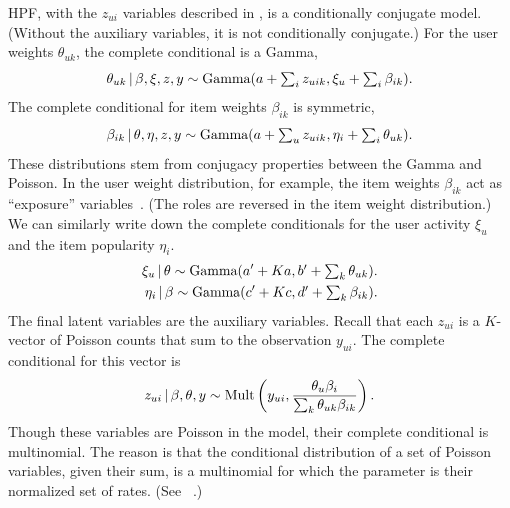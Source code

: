 HPF, with the $z_{ui}$ variables described in , is a
conditionally conjugate model.  (Without the auxiliary variables, it
is not conditionally conjugate.) For the user weights $\theta_{uk}$,
the complete conditional is a Gamma,
\begin{equation}
  \label{eq:user-weight-cc}
  \theta_{uk} \,\vert\, \beta, \xi, z, y \sim
  \textrm{Gamma}(a + \textstyle \sum_{i} z_{uik}, \xi_u + \sum_{i} \beta_{ik}).
\end{equation}
The complete conditional for item weights $\beta_{ik}$ is symmetric,
\begin{equation}
  \label{eq:item-weight-cc}
  \beta_{ik} \,\vert\, \theta, \eta, z, y \sim
  \textrm{Gamma}(a + \textstyle \sum_{u} z_{uik}, \eta_i + \sum_{i} \theta_{uk}).
\end{equation}
These distributions stem from conjugacy properties between the Gamma
and Poisson. In the user weight distribution, for example, the item
weights $\beta_{ik}$ act as ``exposure'' variables~\cite{Gelman:1995}.
(The roles are reversed in the item weight distribution.) We can
similarly write down the complete conditionals for the user activity
$\xi_u$ and the item popularity $\eta_i$.
\begin{align*}
  \label{eq:user-weight-cc}
  \xi_{u} \,\vert\, \theta \sim
  \textrm{Gamma}(a' + \textstyle Ka, b' + \sum_{k} \theta_{uk}).\nonumber\\
  \eta_{i} \,\vert\, \beta \sim
  \textrm{Gamma}(c' + \textstyle Kc, d' + \sum_{k} \beta_{ik}).\nonumber\\
\end{align*}
The final latent variables are the auxiliary variables.  Recall that
each $z_{ui}$ is a $K$-vector of Poisson counts that sum to the
observation $y_{ui}$. The complete conditional for this vector is
\begin{equation}
  \label{eq:aux-cc}
  z_{ui} \,\vert\, \beta, \theta, y \sim \textrm{Mult}\left(y_{ui}, \frac{\theta_{u} 
      \beta_{i}}{\textstyle \sum_{k} \theta_{uk} \beta_{ik}}\right).
\end{equation}
Though these variables are Poisson in the model, their complete
conditional is multinomial.  The reason is that the conditional
distribution of a set of Poisson variables, given their sum, is a
multinomial for which the parameter is their normalized set of
rates. (See ~\cite{Johnson:2005, Cemgil:2009}.)

